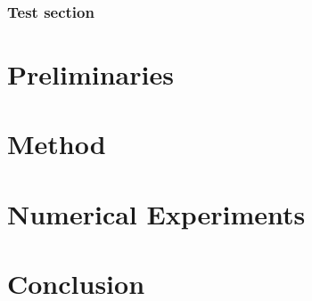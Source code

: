 \documentclass[11pt]{report}
\begin{document}
\subsection{Test section}

\chapter{Preliminaries}
\chapter{Method}
\chapter{Numerical Experiments}
\chapter{Conclusion}



\end{document}
